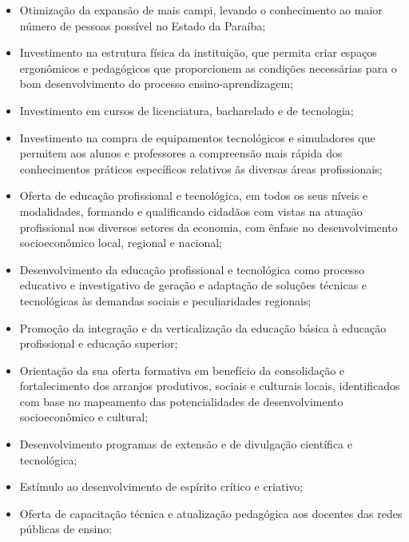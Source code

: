 \begin{itemize}
\item Otimiza\c{c}\~ao da expansão de mais campi, levando o conhecimento ao  maior número de pessoas possível no Estado da Paraíba;

\item Investimento na estrutura física da instituição, que permita criar espaços ergonômicos e pedagógicos que proporcionem as condições necessárias para o bom desenvolvimento do processo ensino-aprendizagem;

\item Investimento em cursos de licenciatura, bacharelado e de tecnologia;

\item Investimento na compra de equipamentos tecnológicos e simuladores que permitem aos alunos e professores a compreensão mais rápida dos conhecimentos práticos específicos relativos \~as diversas áreas profissionais;

\item Oferta de educação profissional e tecnológica, em todos os seus níveis e modalidades, formando e qualificando cidadãos com vistas na atuação profissional nos diversos setores da economia, com ênfase no desenvolvimento socioeconômico local, regional e nacional;

\item Desenvolvimento da educação profissional e tecnológica como processo educativo e investigativo de geração e adaptação de soluções técnicas e tecnológicas às demandas sociais e peculiaridades regionais;

\item Promo\c{c}\~ao da integração e da verticalização da educação básica à educação profissional e educação superior;

\item Orienta\c{c}\~ao da sua oferta formativa em benefício da consolidação e fortalecimento dos arranjos produtivos, sociais e culturais locais, identificados com base no mapeamento das potencialidades de desenvolvimento socioeconômico e cultural;

\item Desenvolvimento programas de extensão e de divulgação científica e tecnológica;

\item Est\'imulo ao desenvolvimento de espírito crítico e criativo;

\item Oferta de capacitação técnica e atualização pedagógica aos docentes das redes públicas de ensino;


\end{itemize}
